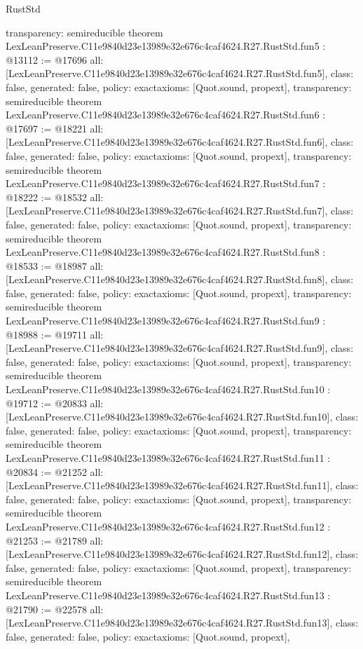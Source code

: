 \begin{lexlean}{RustStd}
\begin{coremodule}
{  transparency: semireducible
}
theorem LexLeanPreserve.C11e9840d23e13989e32e676c4caf4624.R27.RustStd.fun5 : @13112 := @17696 {
  all: [LexLeanPreserve.C11e9840d23e13989e32e676c4caf4624.R27.RustStd.fun5],
  class: false,
  generated: false,
  policy: exact{axioms: [Quot.sound, propext]},
  transparency: semireducible
}
theorem LexLeanPreserve.C11e9840d23e13989e32e676c4caf4624.R27.RustStd.fun6 : @17697 := @18221 {
  all: [LexLeanPreserve.C11e9840d23e13989e32e676c4caf4624.R27.RustStd.fun6],
  class: false,
  generated: false,
  policy: exact{axioms: [Quot.sound, propext]},
  transparency: semireducible
}
theorem LexLeanPreserve.C11e9840d23e13989e32e676c4caf4624.R27.RustStd.fun7 : @18222 := @18532 {
  all: [LexLeanPreserve.C11e9840d23e13989e32e676c4caf4624.R27.RustStd.fun7],
  class: false,
  generated: false,
  policy: exact{axioms: [Quot.sound, propext]},
  transparency: semireducible
}
theorem LexLeanPreserve.C11e9840d23e13989e32e676c4caf4624.R27.RustStd.fun8 : @18533 := @18987 {
  all: [LexLeanPreserve.C11e9840d23e13989e32e676c4caf4624.R27.RustStd.fun8],
  class: false,
  generated: false,
  policy: exact{axioms: [Quot.sound, propext]},
  transparency: semireducible
}
theorem LexLeanPreserve.C11e9840d23e13989e32e676c4caf4624.R27.RustStd.fun9 : @18988 := @19711 {
  all: [LexLeanPreserve.C11e9840d23e13989e32e676c4caf4624.R27.RustStd.fun9],
  class: false,
  generated: false,
  policy: exact{axioms: [Quot.sound, propext]},
  transparency: semireducible
}
theorem LexLeanPreserve.C11e9840d23e13989e32e676c4caf4624.R27.RustStd.fun10 : @19712 := @20833 {
  all: [LexLeanPreserve.C11e9840d23e13989e32e676c4caf4624.R27.RustStd.fun10],
  class: false,
  generated: false,
  policy: exact{axioms: [Quot.sound, propext]},
  transparency: semireducible
}
theorem LexLeanPreserve.C11e9840d23e13989e32e676c4caf4624.R27.RustStd.fun11 : @20834 := @21252 {
  all: [LexLeanPreserve.C11e9840d23e13989e32e676c4caf4624.R27.RustStd.fun11],
  class: false,
  generated: false,
  policy: exact{axioms: [Quot.sound, propext]},
  transparency: semireducible
}
theorem LexLeanPreserve.C11e9840d23e13989e32e676c4caf4624.R27.RustStd.fun12 : @21253 := @21789 {
  all: [LexLeanPreserve.C11e9840d23e13989e32e676c4caf4624.R27.RustStd.fun12],
  class: false,
  generated: false,
  policy: exact{axioms: [Quot.sound, propext]},
  transparency: semireducible
}
theorem LexLeanPreserve.C11e9840d23e13989e32e676c4caf4624.R27.RustStd.fun13 : @21790 := @22578 {
  all: [LexLeanPreserve.C11e9840d23e13989e32e676c4caf4624.R27.RustStd.fun13],
  class: false,
  generated: false,
  policy: exact{axioms: [Quot.sound, propext]},
}
\end{coremodule}
\end{lexlean}
